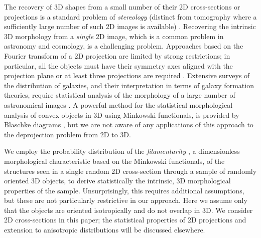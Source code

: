 \documentclass[useAMS,usenatbib]{mn2e}
\begin{document}
The recovery of 3D shapes from a small number of their 2D cross-sections or
projections is a standard problem of \textit{stereology\/} (distinct from
tomography where a sufficiently large number of such 2D images is available)
\citep{SW08}. Recovering the intrinsic 3D morphology from a \textit{single\/}
2D image, which is a common problem in astronomy and cosmology, is a
challenging problem. Approaches based on the Fourier transform of a 2D
projection are limited by strong restrictions; in particular, all the objects
must have their symmetry axes aligned with the projection plane or at least
three projections are required \citep{Ry87}. Extensive surveys of the
distribution of galaxies, and their interpretation in terms of galaxy
formation theories, require statistical analysis of the morphology of a large
number of astronomical images \citep[e.g.,][]{VFNWG14}. A powerful method for
the statistical morphological analysis of convex objects in 3D using Minkowski
functionals, is provided by Blaschke diagrams \citep{SBMSSS99,RDP10a}, but we
are not aware of any applications of this approach to the deprojection problem
from 2D to 3D.

We employ the probability distribution of the \textit{filamentarity\/}
\citep{Mecke94,Sahni98}, a dimensionless morphological characteristic based on
the Minkowski functionals, of the structures seen in a single random  2D
cross-section through a sample of randomly oriented 3D objects, to derive
statistically the intrinsic, 3D morphological properties of the sample.
Unsurprisingly, this requires additional assumptions, but these are not
particularly restrictive in our approach. Here we assume only that the objects
are oriented isotropically and do not overlap in 3D. We consider 2D
cross-sections in this paper; the statistical properties of 2D projections and
extension to anisotropic distributions will be discussed elsewhere.
\end{document}
